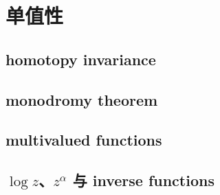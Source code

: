 \section{单值性}
\label{b3:sec:0903}


\subsection{homotopy invariance}
\label{b3:subsec:090301}

\subsection{monodromy theorem}
\label{b3:subsec:090302}

\subsection{multivalued functions}
\label{b3:subsec:090303}

\subsection{\texorpdfstring{\(\log z\)}{m}、\texorpdfstring{\(z^\alpha\)}{zα} 与 inverse functions}
\label{b3:subsec:090304}


